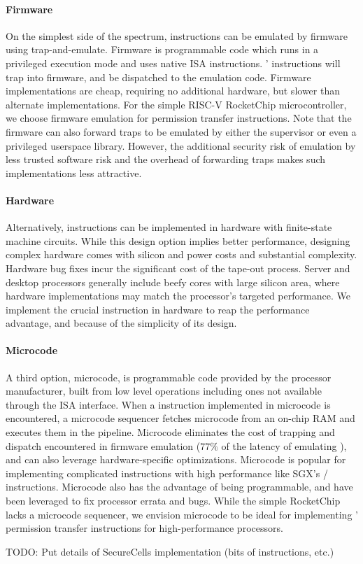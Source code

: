 \paragraph{Firmware}
On the simplest side of the spectrum, instructions can be emulated
by firmware using trap-and-emulate.
Firmware is programmable code which runs in a privileged execution mode 
and uses native ISA instructions.
\seccells' instructions will trap into firmware, and be dispatched to 
the emulation code.
Firmware implementations are cheap, requiring no additional hardware, but 
slower than alternate implementations.
For the simple RISC-V RocketChip microcontroller, we choose 
firmware emulation for permission transfer instructions.
Note that the firmware can also forward traps to be emulated by
either the supervisor or even a privileged userspace library.
However, the additional security risk of emulation by less trusted
software risk and the overhead of forwarding traps makes such
implementations less attractive.

\paragraph{Hardware}
Alternatively, instructions can be implemented in hardware with 
finite-state machine circuits.
While this design option implies better performance,
designing complex hardware comes with silicon and power costs and
substantial complexity.
Hardware bug fixes incur the significant cost of the tape-out process.
Server and desktop processors generally include beefy cores with
large silicon area, where hardware implementations may match the
processor's targeted performance.
We implement the crucial \sdswitch instruction in hardware
to reap the performance advantage,
and because of the simplicity of its design.

\paragraph{Microcode}
A third option, microcode, is programmable code provided by the 
processor manufacturer, built from low level operations including ones 
not available through the ISA interface.
When a instruction implemented in microcode is encountered, a microcode
sequencer fetches microcode from an on-chip RAM and executes them in the
pipeline.
Microcode eliminates the cost of trapping and dispatch encountered in 
firmware emulation ($77\%$ of the latency of emulating \scprot),
and can also leverage hardware-specific optimizations.
Microcode is popular for implementing complicated instructions
with high performance like SGX's / instructions.
Microcode also has the advantage of being programmable, and have been
leveraged to fix processor errata and bugs.
While the simple RocketChip lacks a microcode sequencer, 
we envision microcode to be ideal for implementing \seccells'
permission transfer instructions for high-performance processors.


TODO: Put details of SecureCells implementation (bits of instructions, etc.)
